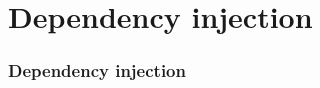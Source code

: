 \section{Dependency injection}
\begin{frame}[fragile]
\frametitle{Dependency injection}


\end{frame}
